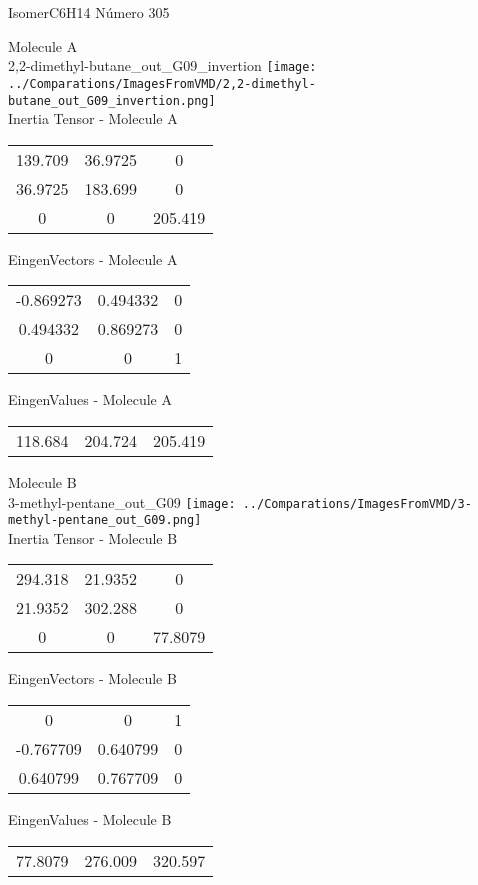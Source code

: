 \vtab[-2cm]
\begin{center}
{\large IsomerC6H14 \tab Número 305}
\end{center}
\begin{multicols}{2}
\begin{center}

Molecule A \\ 
2,2-dimethyl-butane\_out\_G09\_invertion
\texttt{[image: ../Comparations/ImagesFromVMD/2,2-dimethyl-butane\_out\_G09\_invertion.png]}
\\
Inertia Tensor - Molecule A \\
\vtab

\begin{tabular}{|c c c|}
139.709	 & 	36.9725	 & 	0	 \\
36.9725	 & 	183.699	 & 	0	 \\
0	 & 	0	 & 	205.419
\end{tabular}

\vtab
 EingenVectors - Molecule A     \\
\vtab
\begin{tabular}{|c c c|}
-0.869273	 & 	0.494332	 & 	0	 \\
0.494332	 & 	0.869273	 & 	0	 \\
0	 & 	0	 & 	1
\end{tabular}

\vtab
 EingenValues - Molecule A     \\
\vtab
\begin{tabular}{|c c c|}
118.684	 & 	204.724	 & 	205.419	 \\
\end{tabular}
\columnbreak

Molecule B \\ 
3-methyl-pentane\_out\_G09
\texttt{[image: ../Comparations/ImagesFromVMD/3-methyl-pentane\_out\_G09.png]}
\\
Inertia Tensor - Molecule B \\
\vtab

\begin{tabular}{|c c c|}
294.318	 & 	21.9352	 & 	0	 \\
21.9352	 & 	302.288	 & 	0	 \\
0	 & 	0	 & 	77.8079
\end{tabular}

\vtab
 EingenVectors - Molecule B     \\
\vtab
\begin{tabular}{|c c c|}
0	 & 	0	 & 	1	 \\
-0.767709	 & 	0.640799	 & 	0	 \\
0.640799	 & 	0.767709	 & 	0
\end{tabular}

\vtab
 EingenValues - Molecule B     \\
\vtab
\begin{tabular}{|c c c|}
77.8079	 & 	276.009	 & 	320.597	 \\
\end{tabular}

\end{center}
\end{multicols}
